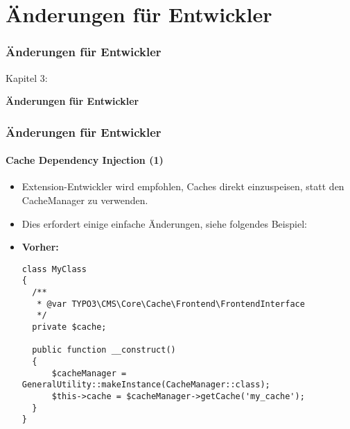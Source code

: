 %

\section{Änderungen für Entwickler}
\begin{frame}[fragile]
	\frametitle{Änderungen für Entwickler}

	\begin{center}\huge{Kapitel 3:}\end{center}
	\begin{center}\huge{\color{typo3darkgrey}\textbf{Änderungen für Entwickler}}\end{center}

\end{frame}


\begin{frame}[fragile]
	\frametitle{Änderungen für Entwickler}
	\framesubtitle{Cache Dependency Injection (1)}

	\lstset{basicstyle=\tiny\ttfamily}

	\begin{itemize}
		\item Extension-Entwickler wird empfohlen, Caches direkt einzuspeisen, statt den CacheManager zu verwenden.
		\item Dies erfordert einige einfache Änderungen, siehe folgendes Beispiel:

		\item \textbf{Vorher:}

\begin{lstlisting}
class MyClass
{
  /**
   * @var TYPO3\CMS\Core\Cache\Frontend\FrontendInterface
   */
  private $cache;

  public function __construct()
  {
      $cacheManager = GeneralUtility::makeInstance(CacheManager::class);
      $this->cache = $cacheManager->getCache('my_cache');
  }
}
\end{lstlisting}

	\end{itemize}

\end{frame}

